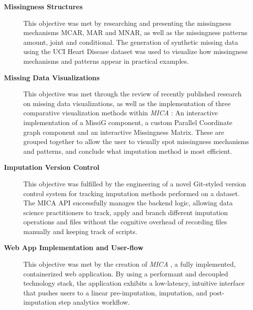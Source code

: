 \documentclass[a4paper, 11pt]{article}
\newcommand{\mica}{\textit{MICA }}
\begin{document}
\begin{description}

        \item[\textbf{Missingness Structures}] This objective was met by
                researching and presenting the missingness mechanisms MCAR, MAR
                and MNAR, as well as the missingness patterns amount, joint and
                conditional. The generation of synthetic missing data using the
                UCI Heart Disease dataset was used to visualize how missingness
                mechanisms and patterns appear in practical examples.

        \item[\textbf{Missing Data Visualizations}] This objective was met
                through the review of recently published research on missing
                data visualizations, as well as the implementation of three
                comparative visualization methods within \mica: An interactive
                implementation of a MissiG component, a custom Parallel
                Coordinate graph component and an interactive Missingness
                Matrix. These are grouped together to allow the user to
                visually spot missingness mechanisms and patterns, and conclude
                what imputation method is most efficient.
        
        \item[\textbf{Imputation Version Control}] This objective was fulfilled
                by the engineering of a novel Git-styled version control system
                for tracking imputation methods performed on a dataset. The
                MICA API successfully manages the backend logic, allowing data
                science practitioners to track, apply and branch different
                imputation operations and files without the cognitive overhead
                of recording files manually and keeping track of scripts.


        \item[\textbf{Web App Implementation and User-flow}] This objective was
                met by the creation of \mica, a fully implemented,
                containerized web application. By using a performant and
                decoupled technology stack, the application exhibits a
                low-latency, intuitive interface that pushes users to a linear
                pre-imputation, imputation, and post-imputation step analytics
                workflow.

\end{description}
\end{document}
